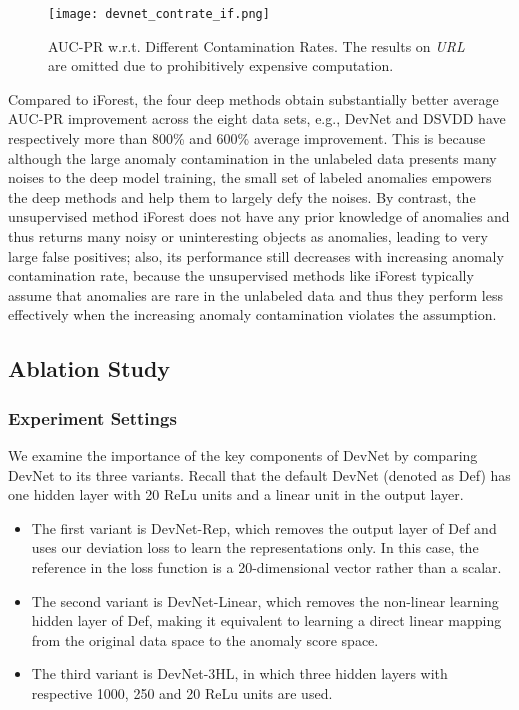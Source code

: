 \documentclass[sigconf]{acmart}
\begin{document}
\begin{figure}[h!]
  \centering
    \texttt{[image: devnet\_contrate\_if.png]}
  \caption{AUC-PR w.r.t. Different Contamination Rates. The results on \textit{URL} are omitted due to prohibitively expensive computation.}
  \label{fig:contrate}
\end{figure}

Compared to iForest, the four deep methods obtain substantially better average AUC-PR improvement across the eight data sets, e.g., DevNet and DSVDD have respectively more than 800\% and 600\% average improvement. This is because although the large anomaly contamination in the unlabeled data presents many noises to the deep model training, the small set of labeled anomalies empowers the deep methods and help them to largely defy the noises. By contrast, the unsupervised method iForest does not have any prior knowledge of anomalies and thus returns many noisy or uninteresting objects as anomalies, leading to very large false positives; also, its performance still decreases with increasing anomaly contamination rate, because the unsupervised methods like iForest typically assume that anomalies are rare in the unlabeled data and thus they perform less effectively when the increasing anomaly contamination violates the assumption.



\subsection{Ablation Study}\label{exp:ablation}

\subsubsection{Experiment Settings}
We examine the importance of the key components of DevNet by comparing DevNet to its three variants. Recall that the default DevNet (denoted as Def) has one hidden layer with 20 ReLu units and a linear unit in the output layer. 
\begin{itemize}
    \item The first variant is DevNet-Rep, which removes the output layer of Def and uses our deviation loss to learn the representations only. In this case, the reference in the loss function is a 20-dimensional vector rather than a scalar.
    \item The second variant is DevNet-Linear, which removes the non-linear learning hidden layer of Def, making it equivalent to learning a direct linear mapping from the original data space to the anomaly score space.
    \item The third variant is DevNet-3HL, in which three hidden layers with respective 1000, 250 and 20 ReLu units are used.
\end{itemize}
 
\end{document}
